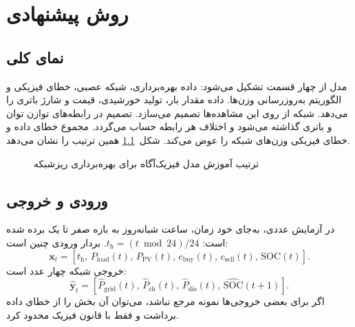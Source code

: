 \chapter{روش پیشنهادی}
\label{chap:method}

\section{نمای کلی}
مدل از چهار قسمت تشکیل می‌شود: داده بهره‌برداری، شبکه عصبی، خطای فیزیکی و الگوریتم به‌روزرسانی وزن‌ها. داده مقدار بار، تولید خورشیدی، قیمت و شارژ باتری را می‌دهد. شبکه از روی این مشاهده‌ها تصمیم می‌سازد. تصمیم در رابطه‌های توازن توان و باتری گذاشته می‌شود و اختلاف هر رابطه حساب می‌گردد. مجموع خطای داده و خطای فیزیکی وزن‌های شبکه را عوض می‌کند. شکل~\ref{fig:pinn-workflow} همین ترتیب را نشان می‌دهد.

\begin{figure}[H]
  \centering
  \caption{ترتیب آموزش مدل فیزیک‌آگاه برای بهره‌برداری ریزشبکه}
  \label{fig:pinn-workflow}
\end{figure}

\section{ورودی و خروجی}
در آزمایش عددی، به‌جای خود زمان، ساعت شبانه‌روز به بازه صفر تا یک برده شده است: $t_{\mathrm{h}}=(t \bmod 24)/24$. بردار ورودی چنین است:
\begin{equation}
  \bm{x}_t=
  \left[t_{\mathrm{h}},\,P_{\mathrm{load}}(t),\,P_{\mathrm{PV}}(t),\,
  c_{\mathrm{buy}}(t),\,c_{\mathrm{sell}}(t),\,\mathrm{SOC}(t)\right].
  \label{eq:model-input}
\end{equation}
خروجی شبکه چهار عدد است:
\begin{equation}
  \hat{\bm{y}}_t=
  \left[\hat{P}_{\mathrm{grid}}(t),\,
  \hat{P}_{\mathrm{ch}}(t),\,
  \hat{P}_{\mathrm{dis}}(t),\,
  \widehat{\mathrm{SOC}}(t+1)\right].
  \label{eq:model-output}
\end{equation}
اگر برای بعضی خروجی‌ها نمونه مرجع نباشد، می‌توان آن بخش را از خطای داده برداشت و فقط با قانون فیزیک محدود کرد.

